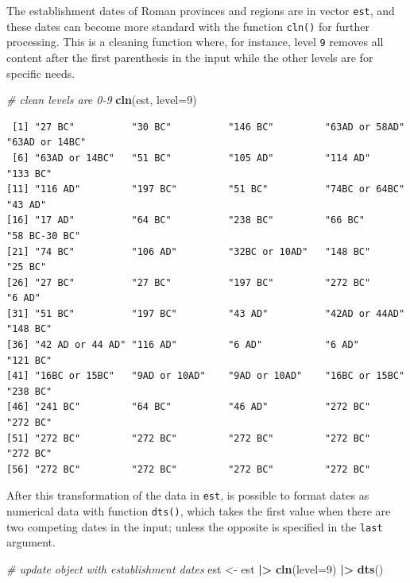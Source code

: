 \documentclass[a4paper,11pt]{memoir}
\newenvironment{Shaded}{\begin{snugshade}}{\end{snugshade}}
\newcommand{\CommentTok}[1]{\textcolor[rgb]{0.56,0.35,0.01}{\textit{#1}}}
\newcommand{\DataTypeTok}[1]{\textcolor[rgb]{0.13,0.29,0.53}{#1}}
\newcommand{\DecValTok}[1]{\textcolor[rgb]{0.00,0.00,0.81}{#1}}
\newcommand{\ErrorTok}[1]{\textcolor[rgb]{0.64,0.00,0.00}{\textbf{#1}}}
\newcommand{\KeywordTok}[1]{\textcolor[rgb]{0.13,0.29,0.53}{\textbf{#1}}}
\newcommand{\NormalTok}[1]{#1}
\newcommand{\OperatorTok}[1]{\textcolor[rgb]{0.81,0.36,0.00}{\textbf{#1}}}
\newcommand{\StringTok}[1]{\textcolor[rgb]{0.31,0.60,0.02}{#1}}
\begin{document}
The establishment dates of Roman provinces and regions are in vector
\texttt{est}, and these dates can become more standard with the function
\texttt{cln()} for further processing. This is a cleaning function
where, for instance, level \texttt{9} removes all content after the
first parenthesis in the input while the other levels are for specific
needs.

\begin{Shaded}
\begin{Highlighting}[]
\CommentTok{# clean levels are 0-9}
\KeywordTok{cln}\NormalTok{(est, }\DataTypeTok{level=}\DecValTok{9}\NormalTok{)}
\end{Highlighting}
\end{Shaded}

\begin{verbatim}
 [1] "27 BC"          "30 BC"          "146 BC"         "63AD or 58AD"   "63AD or 14BC"  
 [6] "63AD or 14BC"   "51 BC"          "105 AD"         "114 AD"         "133 BC"        
[11] "116 AD"         "197 BC"         "51 BC"          "74BC or 64BC"   "43 AD"         
[16] "17 AD"          "64 BC"          "238 BC"         "66 BC"          "58 BC-30 BC"   
[21] "74 BC"          "106 AD"         "32BC or 10AD"   "148 BC"         "25 BC"         
[26] "27 BC"          "27 BC"          "197 BC"         "272 BC"         "6 AD"          
[31] "51 BC"          "197 BC"         "43 AD"          "42AD or 44AD"   "148 BC"        
[36] "42 AD or 44 AD" "116 AD"         "6 AD"           "6 AD"           "121 BC"        
[41] "16BC or 15BC"   "9AD or 10AD"    "9AD or 10AD"    "16BC or 15BC"   "238 BC"        
[46] "241 BC"         "64 BC"          "46 AD"          "272 BC"         "272 BC"        
[51] "272 BC"         "272 BC"         "272 BC"         "272 BC"         "272 BC"        
[56] "272 BC"         "272 BC"         "272 BC"         "272 BC"        
\end{verbatim}

After this transformation of the data in \texttt{est}, is possible to
format dates as numerical data with function \texttt{dts()}, which takes
the first value when there are two competing dates in the input; unless
the opposite is specified in the
\texttt{\textquotesingle{}last\textquotesingle{}} argument.

\begin{Shaded}
\begin{Highlighting}[]
\CommentTok{# update object with establishment dates}
\NormalTok{est <-}\StringTok{ }\NormalTok{est }\OperatorTok{|}\ErrorTok{>}\StringTok{ }
\StringTok{  }\KeywordTok{cln}\NormalTok{(}\DataTypeTok{level=}\DecValTok{9}\NormalTok{) }\OperatorTok{|}\ErrorTok{>}\StringTok{ }
\StringTok{  }\KeywordTok{dts}\NormalTok{()}
\end{Highlighting}
\end{Shaded}
\end{document}
